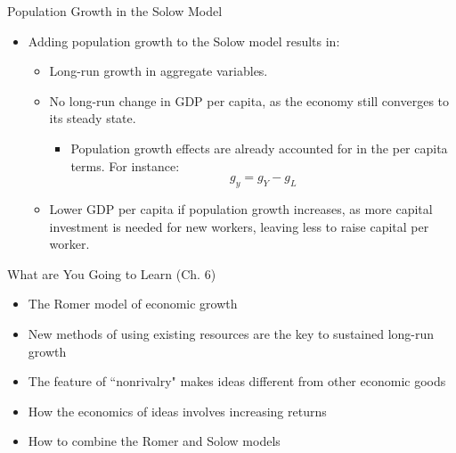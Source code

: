 \documentclass[aspectratio=1610]{beamer}
\begin{document}
\begin{frame}[wide]{Population Growth in the Solow Model}
	\begin{itemize}
		\item Adding population growth to the Solow model results in:
		\vspace{1mm}
		\begin{itemize}
			\item Long-run growth in aggregate variables.
			\item No long-run change in GDP per capita, as the economy still converges to its steady state.
			\begin{itemize}
				\item Population growth effects are already accounted for in the per capita terms. For instance:
				\[
				g_y = g_Y - g_L
				\]
			\end{itemize}
			\item Lower GDP per capita if population growth increases, as more capital investment is needed for new workers, leaving less to raise capital per worker.
		\end{itemize}
	\end{itemize}
\end{frame}



\begin{frame}[wide]{What are You Going to Learn (Ch. 6)}
	\begin{itemize}
		\item The Romer model of economic growth
		\item New methods of using existing resources are the key to sustained long-run growth
		\item The feature of ``nonrivalry" makes ideas different from other economic goods
		\item How the economics of ideas involves increasing returns 
		\item How to combine the Romer and Solow models
	\end{itemize}
\end{frame}
\end{document}
